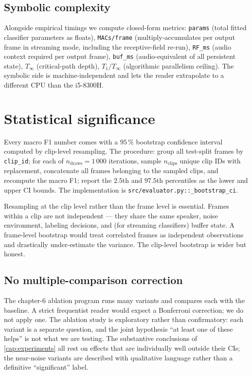 \subsection*{Symbolic complexity}

Alongside empirical timings we compute closed-form metrics: \texttt{params} (total fitted classifier parameters as floats), \texttt{MACs/frame} (multiply-accumulates per output frame in streaming mode, including the receptive-field re-run), \texttt{RF\_ms} (audio context required per output frame), \texttt{buf\_ms} (audio-equivalent of all persistent state), $T_\infty$ (critical-path depth), $T_1 / T_\infty$ (algorithmic parallelism ceiling).
The symbolic side is machine-independent and lets the reader extrapolate to a different CPU than the i5-8300H.

\section{Statistical significance}
\label{sec:eval_significance}

Every macro F1 number comes with a $95\,\%$ bootstrap confidence interval computed by clip-level resampling.
The procedure: group all test-split frames by \texttt{clip\_id}; for each of $n_{\text{draws}} = 1\,000$ iterations, sample $n_{\text{clips}}$ unique clip IDs with replacement, concatenate all frames belonging to the sampled clips, and recompute the macro F1; report the $2.5$th and $97.5$th percentiles as the lower and upper CI bounds.
The implementation is \texttt{src/evaluator.py::\_bootstrap\_ci}.

Resampling at the clip level rather than the frame level is essential.
Frames within a clip are not independent — they share the same speaker, noise environment, labeling decisions, and (for streaming classifiers) buffer state.
A frame-level bootstrap would treat correlated frames as independent observations and drastically under-estimate the variance.
The clip-level bootstrap is wider but honest.

\subsection*{No multiple-comparison correction}

The chapter-6 ablation program runs many variants and compares each with the baseline.
A strict frequentist reader would expect a Bonferroni correction; we do not apply one.
The ablation study is exploratory rather than confirmatory: each variant is a separate question, and the joint hypothesis ``at least one of these helps'' is not what we are testing.
The substantive conclusions of \cref{cap:experiments} all rest on effects that are individually well outside their CIs; the near-noise variants are described with qualitative language rather than a definitive ``significant'' label.

